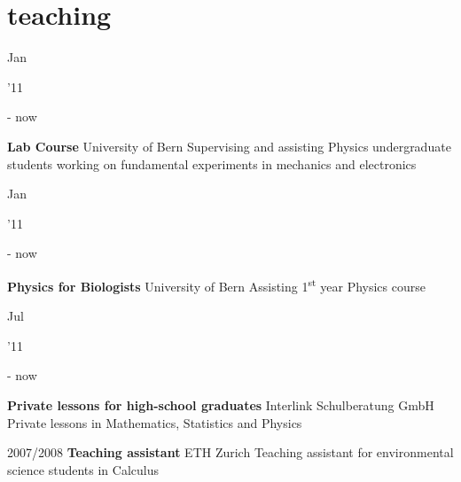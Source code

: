 \documentclass[]{cv} %
\begin{document}
\section{teaching}

\begin{entrylist}

  \entry
  {\parbox[t]{\parboxWidthOne}{Jan}\parbox[t]{\parboxWidthTwo}{\hfill '11} - now}
  {\textbf{Lab Course}}
  {University of Bern}
  {Supervising and assisting Physics undergraduate students working on fundamental experiments in mechanics and electronics}

  \entry
  {\parbox[t]{\parboxWidthOne}{Jan}\parbox[t]{\parboxWidthTwo}{\hfill '11} - now}
  {\textbf{Physics for Biologists}}
  {University of Bern}
  {Assisting 1\textsuperscript{st} year Physics course}

  \entry
  {\parbox[t]{\parboxWidthOne}{Jul}\parbox[t]{\parboxWidthTwo}{\hfill '11} - now}
  {\textbf{Private lessons for high-school graduates}}
  {Interlink Schulberatung GmbH}
  {Private lessons in Mathematics, Statistics and Physics}

  \entry
  {2007/2008}
  {\textbf{Teaching assistant}}
  {ETH Zurich}
  {Teaching assistant for environmental science students in Calculus}

\end{entrylist}

\newpage
\end{document}
